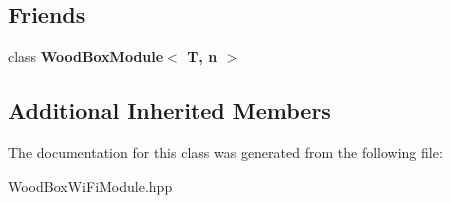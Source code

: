 \subsection*{Friends}
\begin{DoxyCompactItemize}
\item 
\mbox{\label{classwood_box_1_1module_1_1_wood_box_wi_fi_module_a63a1b80c5bfd6525d93f1b3dc9dab20b}} 
class {\bfseries Wood\+Box\+Module$<$ T, n $>$}
\end{DoxyCompactItemize}
\subsection*{Additional Inherited Members}


The documentation for this class was generated from the following file\+:\begin{DoxyCompactItemize}
\item 
Wood\+Box\+Wi\+Fi\+Module.\+hpp\end{DoxyCompactItemize}
